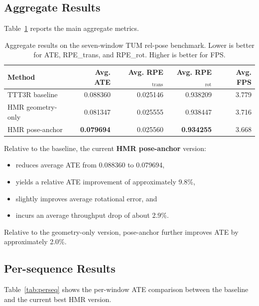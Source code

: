 \documentclass[11pt]{article}
\begin{document}
\subsection{Aggregate Results}
Table~\ref{tab:aggregate} reports the main aggregate metrics.

\begin{table}[h]
\centering
\caption{Aggregate results on the seven-window TUM rel-pose benchmark. Lower is
better for ATE, RPE\_trans, and RPE\_rot. Higher is better for FPS.}
\label{tab:aggregate}
\begin{tabular}{lrrrr}
\toprule
Method & Avg. ATE & Avg. RPE$_{\text{trans}}$ & Avg. RPE$_{\text{rot}}$ & Avg. FPS \\
\midrule
TTT3R baseline & 0.088360 & 0.025146 & 0.938209 & 3.779 \\
HMR geometry-only & 0.081347 & 0.025555 & 0.938447 & 3.716 \\
HMR pose-anchor & \textbf{0.079694} & 0.025560 & \textbf{0.934255} & 3.668 \\
\bottomrule
\end{tabular}
\end{table}

Relative to the baseline, the current \textbf{HMR pose-anchor} version:
\begin{itemize}
\item reduces average ATE from 0.088360 to 0.079694,
\item yields a relative ATE improvement of approximately 9.8\%,
\item slightly improves average rotational error, and
\item incurs an average throughput drop of about 2.9\%.
\end{itemize}

Relative to the geometry-only version, pose-anchor further improves ATE by
approximately 2.0\%.

\subsection{Per-sequence Results}
Table~\ref{tab:perseq} shows the per-window ATE comparison between the baseline
and the current best HMR version.
\end{document}
